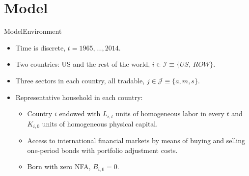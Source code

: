 \documentclass[10pt]{beamer}
\newcommand{\itms}{\itemsep5pt}
\begin{document}
\section{Model}
\begin{frame}{Model}{Environment}
  \begin{itemize}\itms
    \item Time is discrete, $t=1965,\dots,2014$.
    \item Two countries: US and the rest of the world,
          $i\in\mathcal{I}\equiv\{US,\,ROW\}$.
    \item Three sectors in each country, all tradable,
          $j\in\mathcal{J}\equiv\{a,m,s\}$.
    \item Representative household in each country:
      \begin{itemize}\itms
        \item Country $i$ endowed with $L_{i,t}$ units of homogeneous labor in
              every $t$ and $K_{i,0}$ units of homogeneous physical capital.
        \item Access to international financial markets by means of buying and
              selling one-period bonds with portfolio adjustment costs.
        \item Born with zero NFA, $B_{i,0}=0$.
      \end{itemize}
  \end{itemize}
\end{frame}
\end{document}
